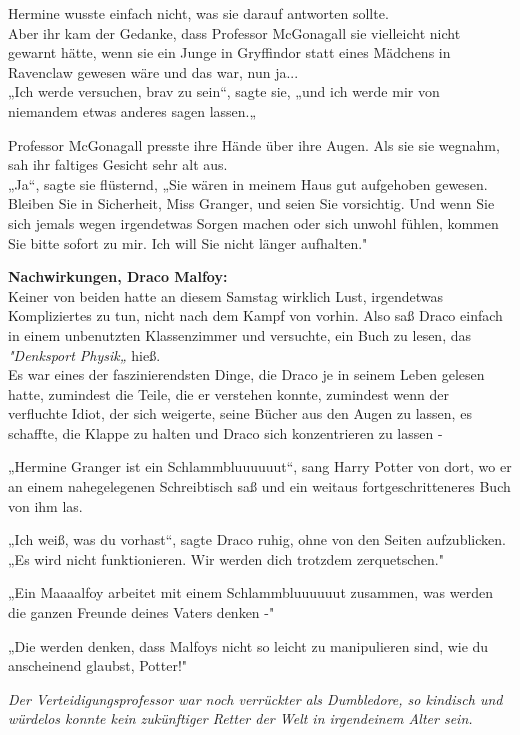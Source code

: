 {Hermine wusste einfach nicht, was sie darauf antworten sollte.\\ Aber ihr kam der Gedanke, dass Professor McGonagall sie vielleicht nicht gewarnt hätte, wenn sie ein Junge in Gryffindor statt eines Mädchens in Ravenclaw gewesen wäre und das war, nun ja...\\ „Ich werde versuchen, brav zu sein“, sagte sie, „und ich werde mir von niemandem etwas anderes sagen lassen.„

Professor McGonagall presste ihre Hände über ihre Augen. Als sie sie wegnahm, sah ihr faltiges Gesicht sehr alt aus.\\ „Ja“, sagte sie flüsternd, „Sie wären in meinem Haus gut aufgehoben gewesen. Bleiben Sie in Sicherheit, Miss Granger, und seien Sie vorsichtig. Und wenn Sie sich jemals wegen irgendetwas Sorgen machen oder sich unwohl fühlen, kommen Sie bitte sofort zu mir. Ich will Sie nicht länger aufhalten."

\textbf{Nachwirkungen, Draco Malfoy:}\\ Keiner von beiden hatte an diesem Samstag wirklich Lust, irgendetwas Kompliziertes zu tun, nicht nach dem Kampf von vorhin. Also saß Draco einfach in einem unbenutzten Klassenzimmer und versuchte, ein Buch zu lesen, das \emph{"Denksport Physik„} hieß.\\ Es war eines der faszinierendsten Dinge, die Draco je in seinem Leben gelesen hatte, zumindest die Teile, die er verstehen konnte, zumindest wenn der verfluchte Idiot, der sich weigerte, seine Bücher aus den Augen zu lassen, es schaffte, die Klappe zu halten und Draco sich konzentrieren zu lassen -

„Hermine Granger ist ein Schlammbluuuuuut“, sang Harry Potter von dort, wo er an einem nahegelegenen Schreibtisch saß und ein weitaus fortgeschritteneres Buch von ihm las.

„Ich weiß, was du vorhast“, sagte Draco ruhig, ohne von den Seiten aufzublicken.\\ „Es wird nicht funktionieren. Wir werden dich trotzdem zerquetschen."

„Ein Maaaalfoy arbeitet mit einem Schlammbluuuuuut zusammen, was werden die ganzen Freunde deines Vaters denken -"

„Die werden denken, dass Malfoys nicht so leicht zu manipulieren sind, wie du anscheinend glaubst, Potter!"

\emph{Der Verteidigungsprofessor war noch verrückter als Dumbledore, so kindisch und würdelos konnte kein zukünftiger Retter der Welt in irgendeinem Alter sein.}

}
